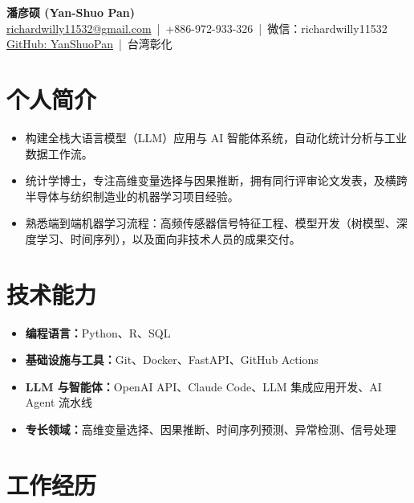 \documentclass[11pt]{ctexart}
\newcommand{\resumeItem}[1]{\item #1}
\newcommand{\resumeSubHeadingListStart}{\begin{itemize}[leftmargin=0.18in, label={}]}
\newcommand{\resumeSubHeadingListEnd}{\end{itemize}}
\begin{document}

\begin{center}
    {\Huge \textbf{潘彦硕 (Yan-Shuo Pan)}}\\[6pt]
    \href{mailto:richardwilly11532@gmail.com}{richardwilly11532@gmail.com} \,|\,
    +886-972-933-326 \,|\,
    微信：richardwilly11532\\[2pt]
    \href{https://github.com/YanShuoPan}{GitHub: YanShuoPan} \,|\,
    台湾彰化
\end{center}


\section{个人简介}
\begin{itemize}[leftmargin=0.2in, itemsep=1pt]
    \item 构建全栈大语言模型（LLM）应用与 AI 智能体系统，自动化统计分析与工业数据工作流。
    \item 统计学博士，专注高维变量选择与因果推断，拥有同行评审论文发表，及横跨半导体与纺织制造业的机器学习项目经验。
    \item 熟悉端到端机器学习流程：高频传感器信号特征工程、模型开发（树模型、深度学习、时间序列），以及面向非技术人员的成果交付。
\end{itemize}



\section{技术能力}

\resumeSubHeadingListStart
\resumeItem{\textbf{编程语言：}Python、R、SQL}
\resumeItem{\textbf{基础设施与工具：}Git、Docker、FastAPI、GitHub Actions}
\resumeItem{\textbf{LLM 与智能体：}OpenAI API、Claude Code、LLM 集成应用开发、AI Agent 流水线}
\resumeItem{\textbf{专长领域：}高维变量选择、因果推断、时间序列预测、异常检测、信号处理}
\resumeSubHeadingListEnd



\section{工作经历}
\end{document}
